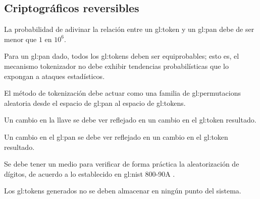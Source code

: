 %
%

\subsection{Criptográficos reversibles}

{
  La probabilidad de adivinar la relación entre un \gls{gl:token} y un
  \gls{gl:pan} debe de ser menor que $ 1 $ en $ 10^6 $.

  {
    Para un \gls{gl:pan} dado, todos los \glspl{gl:token} deben ser
    equiprobables; esto es, el mecanismo tokenizador no debe exhibir
    tendencias probabilísticas que lo expongan a ataques estadísticos.
  }

  {
    El método de tokenización debe actuar como una familia de
    \glspl{gl:permutacion} aleatoria desde el espacio de \gls{gl:pan} al
    espacio de \glspl{gl:token}.
  }

  {
    Un cambio en la llave se debe ver reflejado en un cambio en el
    \gls{gl:token} resultado.
  }

  {
    Un cambio en el \gls{gl:pan} se debe ver reflejado en un cambio en el
    \gls{gl:token} resultado.
  }

  {
    Se debe tener un medio para verificar de forma práctica la aleatorización
    de dígitos, de acuerdo a lo establecido en \gls{gl:nist} 800-90A
    \cite{nist_aleatorios}.
  }

}

{
  Los \glspl{gl:token} generados no se deben almacenar en ningún punto del
  sistema.
}

